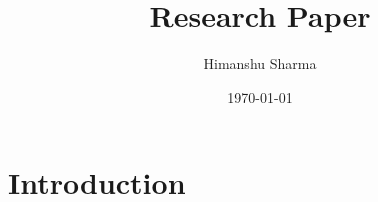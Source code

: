 \documentclass{article}[A4]
\title{Research Paper}
\author{Himanshu Sharma}
\date{\today}
\begin{document}

\maketitle
\pagebreak

\section{Introduction}









\end{document}
